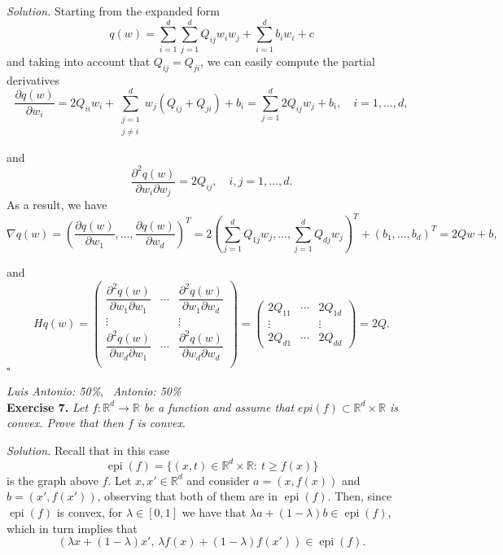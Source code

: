 \documentclass[12pt]{article}
\newcommand*{\QED}{\null\nobreak\hfill\ensuremath{\square}}%
\begin{document}
\emph{Solution.}
Starting from the expanded form
\[
  q(w) = \sum_{i=1}^{d}\sum_{j=1}^d Q_{ij} w_iw_j + \sum_{i=1}^db_i w_i + c
\]
and taking into account that $Q_{ij}=Q_{ji}$, we can easily compute the partial derivatives
\[
    \frac{\partial q(w)}{\partial w_i} = 2Q_{ii}w_i + \sum_{\substack{j=1\\j\neq i}}^d w_j(Q_{ij}+Q_{ji}) + b_i = \sum_{j=1}^d 2Q_{ij}w_j +  b_i, \quad i=1,\dots, d,
\]

and
\[
\frac{\partial ^2 q(w)}{\partial w_i \partial w_j} = 2Q_{ij}, \quad i,j=1,\dots, d.
\]
As a result, we have
\[
     \nabla q(w) = \left(\frac{\partial q(w)}{\partial w_1},\dots, \frac{\partial q(w)}{\partial w_d}\right)^T = 2\left(\sum_{j=1}^d Q_{1j}w_j, \dots, \sum_{j=1}^d Q_{dj}w_j   \right)^T + (b_1,\dots, b_d)^T = 2Qw + b,
\]

and
\[
     Hq(w) =
     \begin{pmatrix}
        \dfrac{\partial ^2 q(w)}{\partial w_1 \partial w_1} & \cdots & \dfrac{\partial ^2 q(w)}{\partial w_1 \partial w_d} \\
        \vdots & & \vdots \\
        \dfrac{\partial ^2 q(w)}{\partial w_d \partial w_1} & \cdots & \dfrac{\partial ^2 q(w)}{\partial w_d \partial w_d} \\
     \end{pmatrix} = \begin{pmatrix}
         2Q_{11} & \cdots & 2Q_{1d}\\
         \vdots & & \vdots \\
         2Q_{d1} & \cdots & 2Q_{dd}
     \end{pmatrix} = 2Q.
\]\QED

\vspace{1em}

\textit{Luis Antonio: 50\%}, \ \textit{Antonio: 50\%}\\
\textbf{Exercise 7. }\emph{Let \( f:\mathbb{R}^d \to \mathbb{R} \)  be a function and assume that \( epi(f) \subset \mathbb{R}^d \times \mathbb{R} \)  is convex. Prove that then \( f \)  is convex}.

\emph{Solution.} Recall that in this case
\[
     \operatorname{epi}(f) = \{(x,t) \in  \mathbb R^d\times \mathbb R: \ t \geq f(x)\}
\]
is the graph above \( f \). Let $x,x'\in \mathbb R^d$ and consider \( a = (x, f(x)) \) and \( b = (x', f(x')) \), observing that both of them are in \( \operatorname{epi}(f) \). Then, since $\operatorname{epi}(f)$ is convex, for $\lambda \in [0,1]$ we have that $\lambda a + (1-\lambda)b \in \operatorname{epi}(f)$, which in turn implies that
\[
(\lambda x + (1-\lambda)x', \, \lambda f(x) + (1-\lambda)f(x')) \in \operatorname{epi}(f).
\]
\end{document}
